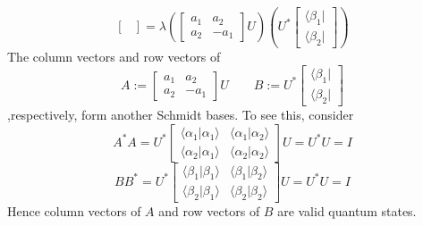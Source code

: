 \begin{enumerate}
\begin{enumerate}
\[\begin{bmatrix}
    \end{bmatrix} = \lambda \left(\begin{bmatrix}
        a_1 & a_2  \\
        a_2 & -a_1
    \end{bmatrix} U\right) \left( U^*
     \begin{bmatrix}
        \langle \beta_1 |  \\
        \langle \beta_2 |
    \end{bmatrix} \right)
    \]
    The column vectors and row vectors of
    \[
    A := \begin{bmatrix}
        a_1 & a_2  \\
        a_2 & -a_1
    \end{bmatrix} U \qquad B := U^*
     \begin{bmatrix}
        \langle \beta_1 |  \\
        \langle \beta_2 |
    \end{bmatrix}
    \]
    ,respectively, form another Schmidt bases. To see this, consider
    \[
    A^* A = U^* \begin{bmatrix}
    \langle \alpha_1 | \alpha_1 \rangle & \langle \alpha_1 | \alpha_2 \rangle \\
    \langle \alpha_2 | \alpha_1 \rangle & \langle \alpha_2 | \alpha_2 \rangle
    \end{bmatrix}  U = U^*U = I
    \]
    \[
    BB^* = U^* \begin{bmatrix}
    \langle \beta_1 | \beta_1 \rangle & \langle \beta_1 | \beta_2 \rangle \\
    \langle \beta_2 | \beta_1 \rangle & \langle \beta_2 | \beta_2 \rangle
    \end{bmatrix}  U = U^*U = I
    \]
    Hence column vectors of $A$ and row vectors of $B$ are valid quantum states.


\end{enumerate}
\end{enumerate}
